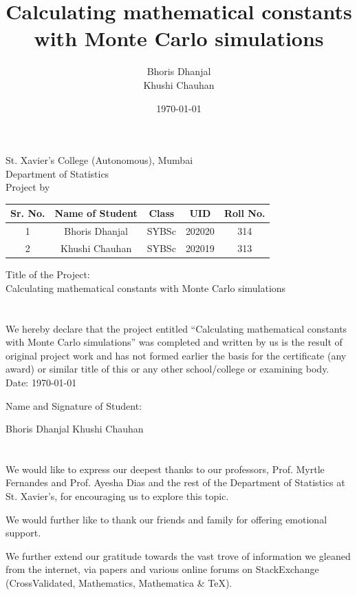 \documentclass[12pt]{article}
\title{Calculating mathematical constants \\with Monte Carlo simulations}
\author{Bhoris Dhanjal\\ Khushi Chauhan }
\date{\today}
\makeatletter
\numberwithin{equation}{section}
\newcommand\frontmatter{%
    \cleardoublepage
  \pagenumbering{roman}}
\makeatother
\begin{document}

\frontmatter
\begin{center}
    \large St. Xavier’s College (Autonomous), Mumbai\\
\large Department of Statistics\\
\large Project by\\
\begin{table}[h!]
\centering
\begin{tabular}{ccccc}
\hline
Sr. No. & Name of Student & Class & UID & Roll No. \\ \hline
1 & Bhoris Dhanjal & SYBSc & 202020 & 314 \\
2 & Khushi Chauhan & SYBSc & 202019 & 313 \\ \hline
\end{tabular}
\end{table}
Title of the Project:\\
Calculating mathematical constants with Monte Carlo simulations
\end{center}
\clearpage

\section*{}
\par We hereby declare that the project entitled “Calculating mathematical constants with Monte Carlo simulations” was completed and
written by us is the result of original project work and has not formed earlier the basis for
the certificate (any award) or similar title of this or any other school/college or examining
body.
\vfill
Date: \today \par
Name and Signature of Student:\\
\par Bhoris Dhanjal \hfill Khushi Chauhan\\
\clearpage

\section*{}
We would like to express our deepest thanks to our professors, Prof. Myrtle Fernandes and Prof. Ayesha Dias and the rest of the Department of Statistics at St. Xavier's, for encouraging us to explore this topic.
\par We would further like to thank our friends and family for offering emotional support.
\par We further extend our gratitude towards the vast trove of information we gleaned from the internet, via papers and various online forums on StackExchange (CrossValidated, Mathematics, Mathematica \& TeX).
\clearpage
\tableofcontents
\end{document}
